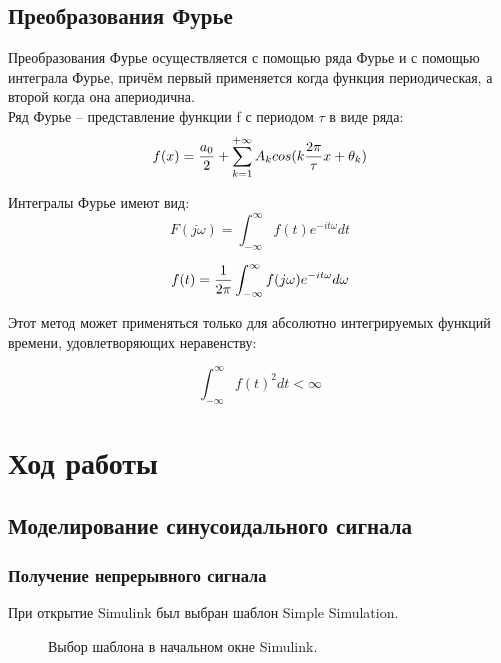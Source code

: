 \documentclass[a4paper,14pt]{extarticle}
\begin{document}
\subsection{Преобразования Фурье}

Преобразования Фурье осуществляется с помощью ряда Фурье и с помощью интеграла Фурье, причём первый применяется когда функция периодическая, а второй когда она апериодична.\\

Ряд Фурье -- представление функции f с периодом $\tau$ в виде ряда:
\begin{equation}
f(x) = {a_0\over 2} + \sum_{k=1}^{+\infty}A_k cos(k{2\pi\over \tau}x + \theta_k)
\end{equation}

Интегралы Фурье имеют вид:
\begin{equation}
F(j\omega) = \int_{-\infty}^{\infty} f(t) e^{-it\omega} dt
\end{equation}

\begin{equation}
f(t) = {{1}\over{2\pi}} \int_{-\infty}^{\infty} f(j\omega) e^{-it\omega} d\omega
\end{equation}

Этот метод может применяться только для абсолютно интегрируемых функций времени, удовлетворяющих неравенству:

\begin{equation}
\int_{-\infty}^{\infty} {f(t)}^2  dt < \infty
\end{equation}

\section{Ход работы}

\subsection{Моделирование синусоидального сигнала}

\subsubsection{Получение непрерывного сигнала}

При открытие Simulink был выбран шаблон Simple Simulation.

\begin{figure}[H]
\caption{Выбор шаблона в начальном окне Simulink.}
\end{figure}
\end{document}
